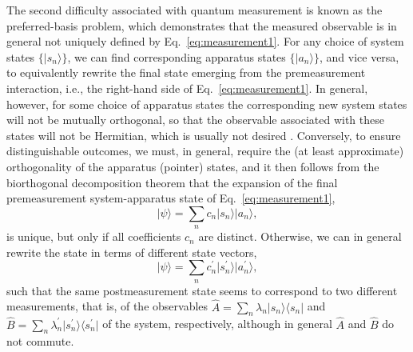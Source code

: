 \documentclass[rmp,aps,amsmath,amsfonts,noshowkeys,noshowpacs,12pt]{revtex4}
\newcommand{\ket}[1]{\ensuremath{|{#1\rangle}}}
\newcommand{\bra}[1]{\ensuremath{{\langle #1}|}}
\begin{document}
The second difficulty associated with quantum measurement is known as
the preferred-basis problem, which demonstrates that the measured
observable is in general not uniquely defined by
Eq.~\eqref{eq:measurement1}. For any choice of system states $\{
\ket{s_n} \}$, we can find corresponding apparatus states $\{
\ket{a_n} \}$, and vice versa, to equivalently rewrite the final state
emerging from the premeasurement interaction, i.e., the right-hand
side of Eq.~\eqref{eq:measurement1}.  In general, however, for some
choice of apparatus states the corresponding new system states will
not be mutually orthogonal, so that the observable associated with
these states will not be Hermitian, which is usually not desired
\citep[however, not forbidden---see the discussion
by][]{Zurek:2002:ii}.  Conversely, to ensure distinguishable outcomes,
we must, in general, require the (at least approximate) orthogonality
of the apparatus (pointer) states, and it then follows from the
biorthogonal decomposition theorem that the expansion of the final
premeasurement system-apparatus state of Eq.~\eqref{eq:measurement1},
%
\begin{equation}
\ket{\psi} = \sum_n c_n \ket{s_n}
\ket{a_n}, 
\end{equation}
%
is unique, but only if all coefficients $c_n$ are distinct. Otherwise, we
can in general rewrite the state in terms of different state vectors,
%
\begin{equation} 
\ket{\psi} = \sum_n c_n^\prime \ket{s^\prime_n}
\ket{a^\prime_n}, 
\end{equation}
%
such that the same postmeasurement state seems to correspond to two
different measurements, that is, of the observables $\widehat{A} =
\sum_n \lambda_n \ket{s_n} \bra{s_n}$ and
$\widehat{B} = \sum_n \lambda_n^\prime \ket{s^\prime_n}
\bra{s^\prime_n}$ of the system, respectively,
although in general $\widehat{A}$ and $\widehat{B}$ do not
commute.
\end{document}
